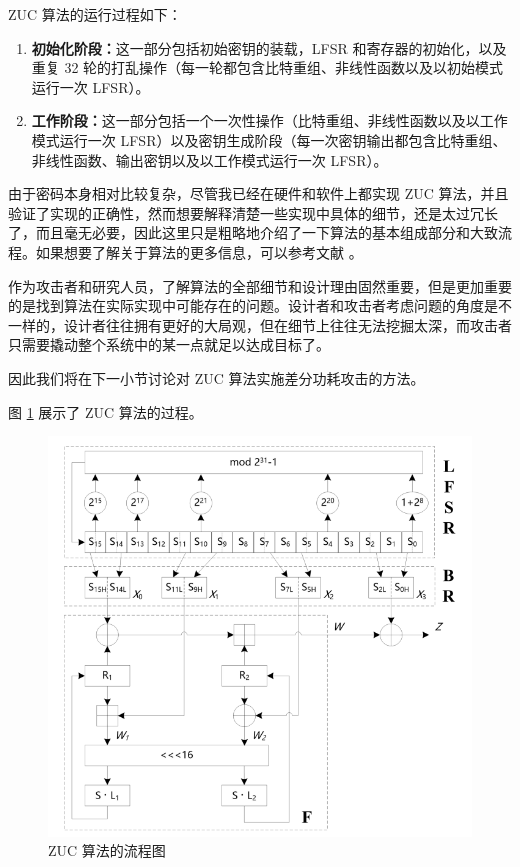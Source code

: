 \vspace*{\baselineskip}

ZUC 算法的运行过程如下：\cite{zuc_standard}

\begin{enumerate}
    \item \textbf{初始化阶段：}这一部分包括初始密钥的装载，LFSR 和寄存器的初始化，以及重复 32 轮的打乱操作（每一轮都包含比特重组、非线性函数以及以初始模式运行一次 LFSR）。
    \item \textbf{工作阶段：}这一部分包括一个一次性操作（比特重组、非线性函数以及以工作模式运行一次 LFSR）以及密钥生成阶段（每一次密钥输出都包含比特重组、非线性函数、输出密钥以及以工作模式运行一次 LFSR）。
\end{enumerate}

\vspace*{\baselineskip}

由于密码本身相对比较复杂，尽管我已经在硬件和软件上都实现 ZUC 算法，并且验证了实现的正确性，然而想要解释清楚一些实现中具体的细节，还是太过冗长了，而且毫无必要，因此这里只是粗略地介绍了一下算法的基本组成部分和大致流程。如果想要了解关于算法的更多信息，可以参考文献 \parencite{zuc_standard}。

作为攻击者和研究人员，了解算法的全部细节和设计理由固然重要，但是更加重要的是找到算法在实际实现中可能存在的问题。设计者和攻击者考虑问题的角度是不一样的，设计者往往拥有更好的大局观，但在细节上往往无法挖掘太深，而攻击者只需要撬动整个系统中的某一点就足以达成目标了。

因此我们将在下一小节讨论对 ZUC 算法实施差分功耗攻击的方法。

\vspace*{\baselineskip}

图 \ref{fig:zuc_algo} 展示了 ZUC 算法的过程。

\begin{figure}[htbp]
    \centering
    \includegraphics[height=.5\textheight]{../images/zuc_algo.png}
    \caption{ZUC 算法的流程图 \cite{zuc_standard}}
    \label{fig:zuc_algo}
\end{figure}


